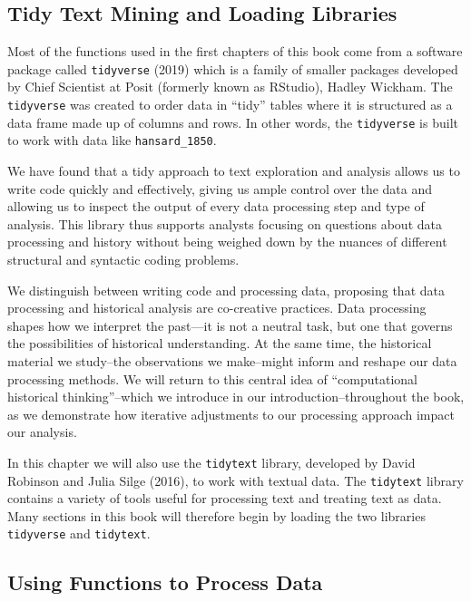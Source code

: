 \documentclass[
]{article}
\newcounter{chapter}
\begin{document}
\subsection{Tidy Text Mining and Loading
Libraries}\label{tidy-text-mining-and-loading-libraries}

Most of the functions used in the first chapters of this book come from
a software package called \texttt{tidyverse} (2019) which is a family of
smaller packages developed by Chief Scientist at Posit (formerly known
as RStudio), Hadley Wickham. The \texttt{tidyverse} was created to order
data in ``tidy'' tables where it is structured as a data frame made up
of columns and rows. In other words, the \texttt{tidyverse} is built to
work with data like \texttt{hansard\_1850}.

We have found that a tidy approach to text exploration and analysis
allows us to write code quickly and effectively, giving us ample control
over the data and allowing us to inspect the output of every data
processing step and type of analysis. This library thus supports
analysts focusing on questions about data processing and history without
being weighed down by the nuances of different structural and syntactic
coding problems.

We distinguish between writing code and processing data, proposing that
data processing and historical analysis are co-creative practices. Data
processing shapes how we interpret the past---it is not a neutral task,
but one that governs the possibilities of historical understanding. At
the same time, the historical material we study--the observations we
make--might inform and reshape our data processing methods. We will
return to this central idea of ``computational historical
thinking''--which we introduce in our introduction--throughout the book,
as we demonstrate how iterative adjustments to our processing approach
impact our analysis.

In this chapter we will also use the \texttt{tidytext} library,
developed by David Robinson and Julia Silge (2016), to work with textual
data. The \texttt{tidytext} library contains a variety of tools useful
for processing text and treating text as data. Many sections in this
book will therefore begin by loading the two libraries
\texttt{tidyverse} and \texttt{tidytext}.

\subsection{Using Functions to Process
Data}\label{using-functions-to-process-data}
\end{document}
